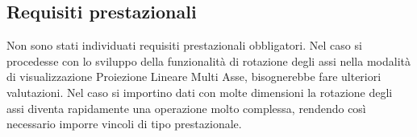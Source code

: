 \subsection{Requisiti prestazionali}
\label{sub:requisiti_prestazionali}
Non sono stati individuati requisiti prestazionali obbligatori. Nel caso si procedesse con lo sviluppo della funzionalità di rotazione degli assi nella modalità di visualizzazione Proiezione Lineare Multi Asse,
bisognerebbe fare ulteriori valutazioni. Nel caso si importino dati con molte dimensioni la rotazione degli assi diventa rapidamente una operazione molto complessa, rendendo così necessario imporre vincoli di tipo prestazionale.
